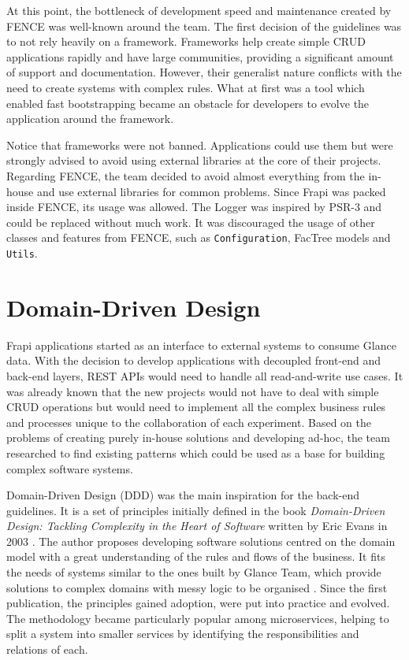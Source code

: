 At this point, the bottleneck of development speed and maintenance created by FENCE was well-known around the team. The first decision of the guidelines was to not rely heavily on a framework. Frameworks help create simple CRUD applications rapidly and have large communities, providing a significant amount of support and documentation. However, their generalist nature conflicts with the need to create systems with complex rules. What at first was a tool which enabled fast bootstrapping became an obstacle for developers to evolve the application around the framework.

Notice that frameworks were not banned. Applications could use them but were strongly advised to avoid using external libraries at the core of their projects. Regarding FENCE, the team decided to avoid almost everything from the in-house and use external libraries for common problems. Since Frapi was packed inside FENCE, its usage was allowed. The Logger was inspired by PSR-3 \cite{psr-3} and could be replaced without much work. It was discouraged the usage of other classes and features from FENCE, such as \texttt{Configuration}, FacTree models and \texttt{Utils}.

\section{Domain-Driven Design}
\label{sec:ddd}

Frapi applications started as an interface to external systems to consume Glance data. With the decision to develop applications with decoupled front-end and back-end layers, REST APIs would need to handle all read-and-write use cases. It was already known that the new projects would not have to deal with simple CRUD operations but would need to implement all the complex business rules and processes unique to the collaboration of each experiment. Based on the problems of creating purely in-house solutions and developing ad-hoc, the team researched to find existing patterns which could be used as a base for building complex software systems.

Domain-Driven Design (DDD) was the main inspiration for the back-end guidelines. It is a set of principles initially defined in the book \textit{Domain-Driven Design: Tackling Complexity in the Heart of Software} written by Eric Evans in 2003 \cite{ddd-blue-book}. The author proposes developing software solutions centred on the domain model with a great understanding of the rules and flows of the business. It fits the needs of systems similar to the ones built by Glance Team, which provide solutions to complex domains with messy logic to be organised \cite{ddd-martin-folwer}. Since the first publication, the principles gained adoption, were put into practice and evolved. The methodology became particularly popular among microservices, helping to split a system into smaller services by identifying the responsibilities and relations of each.

